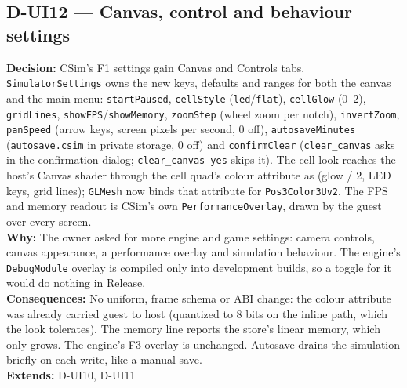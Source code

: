 \subsection*{D-UI12 --- Canvas, control and behaviour settings}
\begin{decisionbox}[title={D-UI12 \quad 2026-09-25}]
\textbf{Decision:} CSim's F1 settings gain Canvas and Controls tabs.
\texttt{SimulatorSettings} owns the new keys, defaults and ranges for both the
canvas and the main menu: \texttt{startPaused}, \texttt{cellStyle}
(\texttt{led}/\texttt{flat}), \texttt{cellGlow} (0--2), \texttt{gridLines},
\texttt{showFPS}/\texttt{showMemory}, \texttt{zoomStep} (wheel zoom per notch),
\texttt{invertZoom}, \texttt{panSpeed} (arrow keys, screen pixels per second,
0 off), \texttt{autosaveMinutes} (\texttt{autosave.csim} in private storage, 0
off) and \texttt{confirmClear} (\texttt{clear\_canvas} asks in the
confirmation dialog; \texttt{clear\_canvas yes} skips it). The cell look
reaches the host's Canvas shader through the cell quad's colour attribute as
(glow / 2, LED keys, grid lines); \texttt{GLMesh} now binds that attribute for
\texttt{Pos3Color3Uv2}. The FPS and memory readout is CSim's own
\texttt{PerformanceOverlay}, drawn by the guest over every screen.\\
\textbf{Why:} The owner asked for more engine and game settings: camera
controls, canvas appearance, a performance overlay and simulation behaviour.
The engine's \texttt{DebugModule} overlay is compiled only into development
builds, so a toggle for it would do nothing in Release.\\
\textbf{Consequences:} No uniform, frame schema or ABI change: the colour
attribute was already carried guest to host (quantized to 8 bits on the inline
path, which the look tolerates). The memory line reports the store's linear
memory, which only grows. The engine's F3 overlay is unchanged. Autosave drains
the simulation briefly on each write, like a manual save.\\
\textbf{Extends:} D-UI10, D-UI11
\end{decisionbox}

